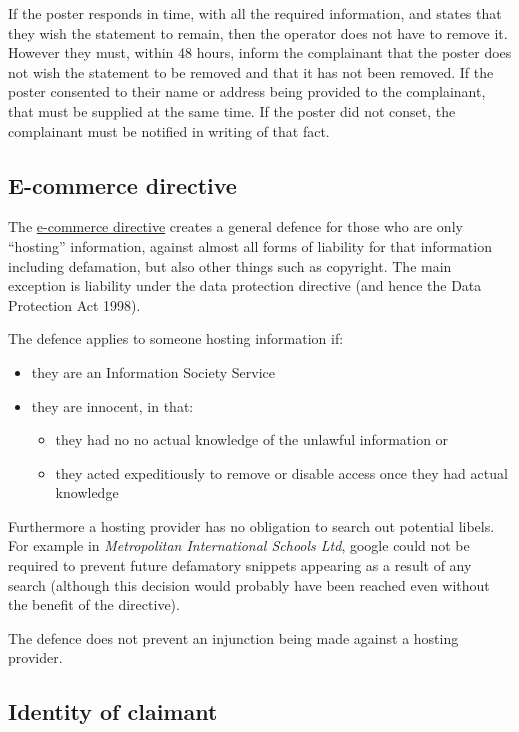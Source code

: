\documentclass[]{article}
\begin{document}
If the poster responds in time, with all the required information, and states that they wish the statement to remain, then the operator does not have to remove it. However they must, within 48 hours, inform the complainant that the poster does not wish the statement to be removed and that it has not been removed. If the poster consented to their name or address being provided to the complainant, that must be supplied at the same time. If the poster did not conset, the complainant must be notified in writing of that fact.

\subsection{E-commerce directive}

The \href{http://eur-lex.europa.eu/legal-content/en/ALL/?uri=CELEX:32000L0031}{e-commerce directive} creates a general defence for those who are only ``hosting'' information, against almost all forms of liability for that information
including defamation, but also other things such as copyright. The main exception is liability under the data protection directive (and hence the Data Protection Act 1998). 

The defence applies to someone hosting information if:

\begin{itemize}
\item
  they are an Information Society Service
\item
  they are innocent, in that:

  \begin{itemize}
  \item
    they had no no actual knowledge of the unlawful information or
  \item
    they acted expeditiously to remove or disable access once they had actual knowledge
  \end{itemize}
\end{itemize}

Furthermore a hosting provider has no obligation to search out potential libels. For example in  \emph{Metropolitan International Schools Ltd}, google could not  be  required to prevent future defamatory snippets appearing as a result
  of any search (although this decision would probably have been reached
  even without the benefit of the directive).

The defence does not prevent an injunction being made against a hosting provider.

\subsection{Identity of claimant}
\end{document}
